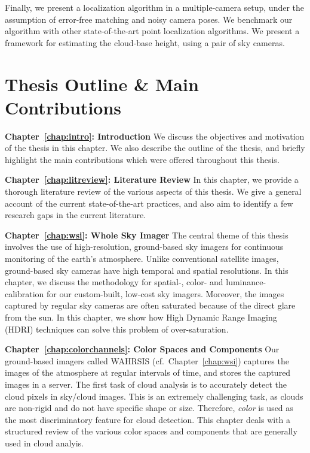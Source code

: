 Finally, we present a localization algorithm in a multiple-camera setup, under the assumption of error-free matching and noisy camera poses. We benchmark our algorithm with other state-of-the-art point localization algorithms. We present a framework for estimating the cloud-base height, using a pair of sky cameras.


\section{Thesis Outline \& Main Contributions}
\forceindent \textbf{Chapter~\ref{chap:intro}: Introduction} \tab We discuss the objectives and motivation of the thesis in this chapter. We also describe the outline of the thesis, and briefly highlight the main contributions which were offered throughout this thesis.

\textbf{Chapter~\ref{chap:litreview}: Literature Review} \tab In this chapter, we provide a thorough literature review of the various aspects of this thesis. We give a general account of the current state-of-the-art practices, and also aim to identify a few research gaps in the current literature. 

\textbf{Chapter~\ref{chap:wsi}: Whole Sky Imager} \tab The central theme of this thesis involves the use of high-resolution, ground-based sky imagers for continuous monitoring of the earth's atmosphere. Unlike conventional satellite images, ground-based sky cameras have high temporal and spatial resolutions. In this chapter, we discuss the methodology for spatial-, color- and luminance- calibration for our custom-built, low-cost sky imagers. Moreover, the images captured by regular sky cameras are often saturated because of the direct glare from the sun. In this chapter, we show how High Dynamic Range Imaging (HDRI) techniques can solve this problem of over-saturation. 



\textbf{Chapter~\ref{chap:colorchannels}: Color Spaces and Components} \tab Our ground-based imagers called WAHRSIS (cf.\ Chapter~\ref{chap:wsi}) captures the images of the atmosphere at regular intervals of time, and stores the captured images in a server. The first task of cloud analysis is to accurately detect the cloud pixels in sky/cloud images. This is an extremely challenging task, as clouds are non-rigid and do not have specific shape or size. Therefore, \emph{color} is used as the most discriminatory feature for cloud detection. This chapter deals with a structured review of the various color spaces and components that are generally used in cloud analyis.



